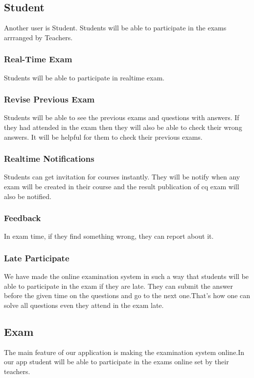 \documentclass[10pt]{article}
\begin{document}
\subsection{Student}

Another user is Student. Students will be able to participate in the exams arrranged by Teachers.

\subsubsection{Real-Time Exam} Students will be able to  participate in realtime exam.

\subsubsection{Revise Previous Exam} Students will be able to see the previous exams and questions with answers. If they had attended in the exam then they will also be able to check their wrong answers. It will be helpful for them to check their previous exams.

\subsubsection{Realtime Notifications} Students can get invitation for courses instantly. They will be notify when any exam will be created in their course and the result publication of cq exam will also be notified.

\subsubsection{Feedback} In exam time, if they find something wrong, they can report about it.

\subsubsection{Late Participate}
We have made the online examination system in such a way that students will be able to participate in the exam if they are late. They can submit the answer before the given time on the questions and go to the next one.That's how one can solve all questions even they attend in the exam late.

\subsection{Exam}

The main feature of our application is making the examination system online.In our app student will be able to participate in the exams online set by their teachers.
\end{document}
